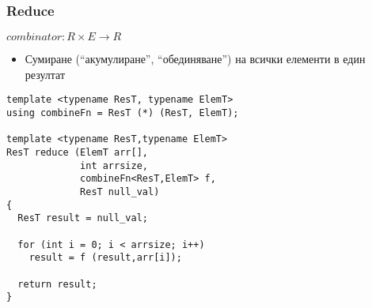 \documentclass{beamer}
\begin{document}
\begin{frame}[fragile]
\frametitle{Reduce}

\begin{center}
$combinator: R \times E \rightarrow R$
\end{center}

\begin{itemize}
  \item Сумиране (``акумулиране'', ``обединяване'') на всички елементи в един резултат
\end{itemize}

\begin{flushleft}
\begin{lstlisting}
template <typename ResT, typename ElemT>
using combineFn = ResT (*) (ResT, ElemT);

template <typename ResT,typename ElemT>
ResT reduce (ElemT arr[], 
             int arrsize, 
             combineFn<ResT,ElemT> f, 
             ResT null_val)
{
  ResT result = null_val;

  for (int i = 0; i < arrsize; i++)
    result = f (result,arr[i]);

  return result;
}
\end{lstlisting}  
\end{flushleft}

  
\end{frame}
\end{document}

